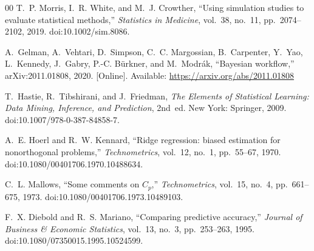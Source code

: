 \begin{thebibliography}{00}
 T.~P. Morris, I.~R. White, and M.~J. Crowther, ``Using simulation studies to evaluate statistical
methods,'' \emph{Statistics in Medicine}, vol.~38, no.~11, pp.~2074--2102, 2019. doi:10.1002/sim.8086.

 A.~Gelman, A.~Vehtari, D.~Simpson, C.~C. Margossian, B.~Carpenter, Y.~Yao, L.~Kennedy, J.~Gabry,
P.-C. B\"urkner, and M.~Modr\'ak, ``Bayesian workflow,'' arXiv:2011.01808, 2020. [Online]. Available:
\url{https://arxiv.org/abs/2011.01808}

 T.~Hastie, R.~Tibshirani, and J.~Friedman, \emph{The Elements of Statistical Learning: Data Mining,
Inference, and Prediction}, 2nd~ed. New York: Springer, 2009. doi:10.1007/978-0-387-84858-7.

 A.~E. Hoerl and R.~W. Kennard, ``Ridge regression: biased estimation for nonorthogonal problems,''
\emph{Technometrics}, vol.~12, no.~1, pp.~55--67, 1970. doi:10.1080/00401706.1970.10488634.

 C.~L. Mallows, ``Some comments on $C_p$,'' \emph{Technometrics}, vol.~15, no.~4, pp.~661--675, 1973.
doi:10.1080/00401706.1973.10489103.

 F.~X. Diebold and R.~S. Mariano, ``Comparing predictive accuracy,'' \emph{Journal of Business \&
Economic Statistics}, vol.~13, no.~3, pp.~253--263, 1995. doi:10.1080/07350015.1995.10524599.

\end{thebibliography}
